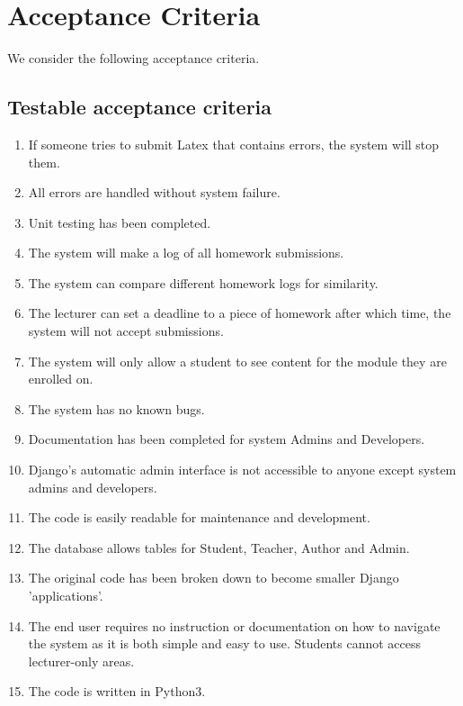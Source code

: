 \section{Acceptance Criteria}
	We consider the following acceptance criteria.
	
	\subsection*{Testable acceptance criteria}
	\begin{enumerate}
    \item If someone tries to submit Latex that contains errors, the system will stop them.
	\item All errors are handled without system failure.
	\item Unit testing has been completed.
	\item The system will make a log of all homework submissions.
	\item The system can compare different homework logs for similarity.
	\item The lecturer can set a deadline to a piece of homework after which time, the system will not accept submissions.
	\item The system will only allow a student to see content for the module they are enrolled on.
	\item The system has no known bugs.
	\item Documentation has been completed for system Admins and Developers.
    \item Django's automatic admin interface is not accessible to anyone except system admins and developers.
	\item The code is easily readable for maintenance and development.
    \item The database allows tables for Student, Teacher, Author and Admin.
    \item The original code has been broken down to become smaller Django 'applications'.
	\item The end user requires no instruction or documentation on how to navigate the system as it is both simple and easy to use.
	Students cannot access lecturer-only areas.
	\item The code is written in Python3.
	\end{enumerate}
	

    \newpage
    
